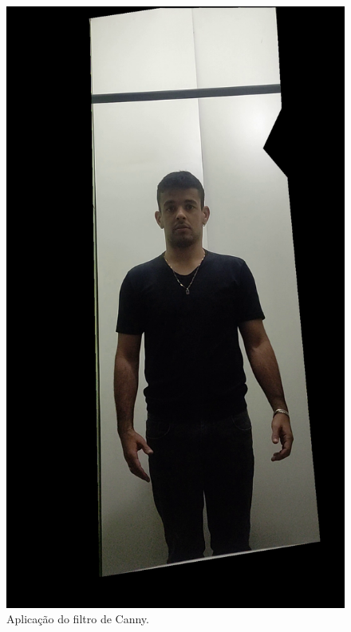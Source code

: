 \begin{figure}[htb]
    \centering
        \caption{Aplicação do filtro de Canny.}
        \begin{minipage}{0.45\textwidth}
            \includegraphics[width=\textwidth]{figuras/filter/canny/mask.png}
        \end{minipage}
        \begin{minipage}{0.45\textwidth}

\end{minipage}
\end{figure}
